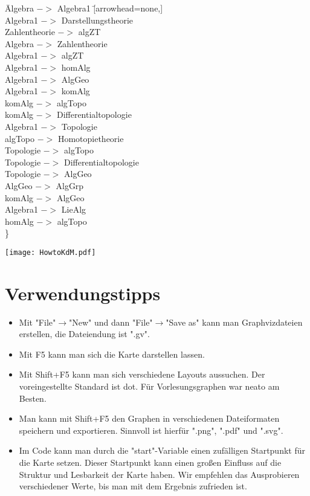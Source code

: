 \documentclass{article}
\begin{document}
\begin{tabbing}
\=Algebra $-$$>$ Algebra1 \hspace{3cm} \=[arrowhead=none,] \\
\>Algebra1 $-$$>$ Darstellungstheorie \\
\>Zahlentheorie $-$$>$ algZT \\
\>Algebra $-$$>$ Zahlentheorie\>[arrowhead=none] \\
\>Algebra1 $-$$>$ algZT \\
\>Algebra1 $-$$>$ homAlg \\
\>Algebra1 $-$$>$ AlgGeo \\
\>Algebra1 $-$$>$ komAlg\\
\>komAlg $-$$>$ algTopo \>    		[style=dotted] \\
\>komAlg $-$$>$ Differentialtopologie    \>	[style=dotted] \\
\>Algebra1 $-$$>$ Topologie     	\>	[style=dotted]\\ 
\>algTopo $-$$>$ Homotopietheorie \\
\>Topologie $-$$>$ algTopo \\
\>Topologie $-$$>$ Differentialtopologie   \>  	[style=dotted] \\
\>Topologie $-$$>$ AlgGeo     	\>	[style=dotted] \\
\>AlgGeo $-$$>$ AlgGrp \\
\>komAlg $-$$>$ AlgGeo \\
\>Algebra1 $-$$>$ LieAlg \\
\>homAlg $-$$>$ algTopo     	\>	[style=dotted] \\
\>\}
\end{tabbing}	
\noindent

\begin{minipage}{1.2 \textwidth}
    \texttt{[image: HowtoKdM.pdf]}
\end{minipage}

\section{Verwendungstipps}
\begin{itemize}
\item Mit "File"$\rightarrow$"New" und dann "File"$\rightarrow$"Save as" kann man Graphvizdateien erstellen, die Dateiendung ist ".gv".
\item Mit F5 kann man sich die Karte darstellen lassen.
\item Mit Shift+F5 kann man sich verschiedene Layouts aussuchen. Der voreingestellte Standard ist dot. Für Vorlesungsgraphen war neato am Besten.
\item Man kann mit Shift+F5 den Graphen in verschiedenen Dateiformaten speichern und exportieren. Sinnvoll ist hierfür ".png", ".pdf" und ".svg".
\item Im Code kann man durch die "start"-Variable einen zufälligen Startpunkt für die Karte setzen. Dieser Startpunkt kann einen großen Einfluss auf die Struktur und Lesbarkeit der Karte haben. Wir empfehlen das Ausprobieren verschiedener Werte, bis man mit dem Ergebnis zufrieden ist.
\end{itemize}
\end{document}
